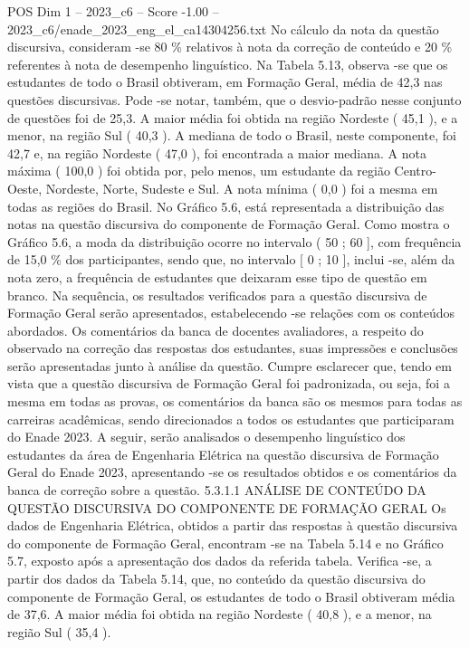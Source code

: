 \begin{textsample}{POS Dim 1 – 2023\_c6 – Score -1.00 – 2023\_c6/enade\_2023\_eng\_el\_ca14304256.txt}
No cálculo da nota da questão discursiva, consideram -se 80 \% relativos à nota da correção de conteúdo e 20 \% referentes à nota de desempenho linguístico.
Na Tabela 5.13, observa -se que os estudantes de todo o Brasil obtiveram, em Formação Geral, média de 42,3 nas questões discursivas.
Pode -se notar, também, que o desvio-padrão nesse conjunto de questões foi de 25,3.
A maior média foi obtida na região Nordeste ( 45,1 ), e a menor, na região Sul ( 40,3 ).
A mediana de todo o Brasil, neste componente, foi 42,7 e, na região Nordeste ( 47,0 ), foi encontrada a maior mediana.
A nota máxima ( 100,0 ) foi obtida por, pelo menos, um estudante da região Centro-Oeste, Nordeste, Norte, Sudeste e Sul.
A nota mínima ( 0,0 ) foi a mesma em todas as regiões do Brasil.
No Gráfico 5.6, está representada a distribuição das notas na questão discursiva do componente de Formação Geral.
Como mostra o Gráfico 5.6, a moda da distribuição ocorre no intervalo ( 50 ; 60 ], com frequência de 15,0 \% dos participantes, sendo que, no intervalo [ 0 ; 10 ], inclui -se, além da nota zero, a frequência de estudantes que deixaram esse tipo de questão em branco.
Na sequência, os resultados verificados para a questão discursiva de Formação Geral serão apresentados, estabelecendo -se relações com os conteúdos abordados.
Os comentários da banca de docentes avaliadores, a respeito do observado na correção das respostas dos estudantes, suas impressões e conclusões serão apresentadas junto à análise da questão.
Cumpre esclarecer que, tendo em vista que a questão discursiva de Formação Geral foi padronizada, ou seja, foi a mesma em todas as provas, os comentários da banca são os mesmos para todas as carreiras acadêmicas, sendo direcionados a todos os estudantes que participaram do Enade 2023.
A seguir, serão analisados o desempenho linguístico dos estudantes da área de Engenharia Elétrica na questão discursiva de Formação Geral do Enade 2023, apresentando -se os resultados obtidos e os comentários da banca de correção sobre a questão. 5.3.1.1 ANÁLISE DE CONTEÚDO DA QUESTÃO DISCURSIVA DO COMPONENTE DE FORMAÇÃO GERAL Os dados de Engenharia Elétrica, obtidos a partir das respostas à questão discursiva do componente de Formação Geral, encontram -se na Tabela 5.14 e no Gráfico 5.7, exposto após a apresentação dos dados da referida tabela.
Verifica -se, a partir dos dados da Tabela 5.14, que, no conteúdo da questão discursiva do componente de Formação Geral, os estudantes de todo o Brasil obtiveram média de 37,6.
A maior média foi obtida na região Nordeste ( 40,8 ), e a menor, na região Sul ( 35,4 ).

\end{textsample}
